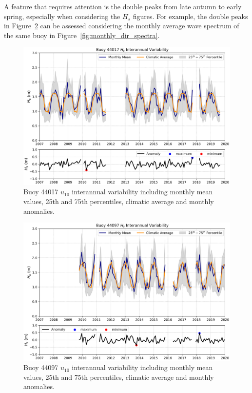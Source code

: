 A feature that requires attention is the double peaks from late autumn to early spring, especially when considering the $H_{s}$ figures. For example, the double peaks in Figure~\ref{fig:b44097_wave_inter} can be assessed considering the monthly average wave spectrum of the same buoy in Figure~\ref{fig:monthly_dir_spectra}. 


\begin{figure}[H]
\centering
\includegraphics[width=0.83\linewidth]{Figures/Chapter5/b44017_interranual_anomaly_hs.png}
\caption{Buoy 44017 $u_{10}$ interannual variability including monthly mean values, 25th and 75th percentiles, climatic average and monthly anomalies.}
\label{fig:b44017_wave_inter}
\end{figure}


\begin{figure}[H]
\centering
\includegraphics[width=0.83\linewidth]{Figures/Chapter5/b44097_interranual_anomaly_hs.png}
\caption{Buoy 44097 $u_{10}$ interannual variability including monthly mean values, 25th and 75th percentiles, climatic average and monthly anomalies.}
\label{fig:b44097_wave_inter}
\end{figure}

